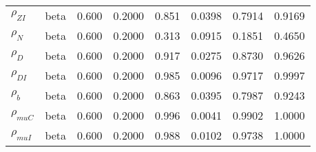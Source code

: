 \begin{center}
\begin{longtable}{llcccccc}
${\rho_{ZI}}$ & beta &   0.600 & 0.2000 &   0.851& 0.0398 &  0.7914 &  0.9169 \\ 
${\rho_N}$ & beta &   0.600 & 0.2000 &   0.313& 0.0915 &  0.1851 &  0.4650 \\ 
${\rho_D}$ & beta &   0.600 & 0.2000 &   0.917& 0.0275 &  0.8730 &  0.9626 \\ 
${\rho_{DI}}$ & beta &   0.600 & 0.2000 &   0.985& 0.0096 &  0.9717 &  0.9997 \\ 
${\rho_b}$ & beta &   0.600 & 0.2000 &   0.863& 0.0395 &  0.7987 &  0.9243 \\ 
${\rho_{muC}}$ & beta &   0.600 & 0.2000 &   0.996& 0.0041 &  0.9902 &  1.0000 \\ 
${\rho_{muI}}$ & beta &   0.600 & 0.2000 &   0.988& 0.0102 &  0.9738 &  1.0000 \\ 
\end{longtable}
 \end{center}
